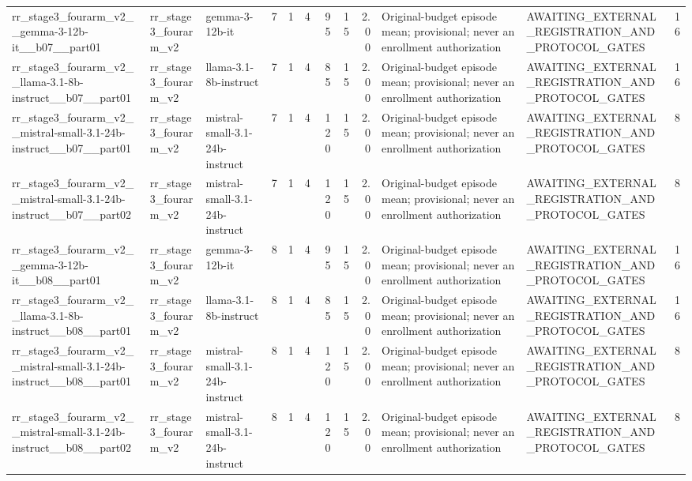 \begin{tabular}{lllrrrrrrllr}
rr\_stage3\_fourarm\_v2\_\_gemma-3-12b-it\_\_b07\_\_part01 & rr\_stage3\_fourarm\_v2 & gemma-3-12b-it & 7 & 1 & 4 & 95 & 15 & 2.00 & Original-budget episode mean; provisional; never an enrollment authorization & AWAITING\_EXTERNAL\_REGISTRATION\_AND\_PROTOCOL\_GATES & 16 \\
rr\_stage3\_fourarm\_v2\_\_llama-3.1-8b-instruct\_\_b07\_\_part01 & rr\_stage3\_fourarm\_v2 & llama-3.1-8b-instruct & 7 & 1 & 4 & 85 & 15 & 2.00 & Original-budget episode mean; provisional; never an enrollment authorization & AWAITING\_EXTERNAL\_REGISTRATION\_AND\_PROTOCOL\_GATES & 16 \\
rr\_stage3\_fourarm\_v2\_\_mistral-small-3.1-24b-instruct\_\_b07\_\_part01 & rr\_stage3\_fourarm\_v2 & mistral-small-3.1-24b-instruct & 7 & 1 & 4 & 120 & 15 & 2.00 & Original-budget episode mean; provisional; never an enrollment authorization & AWAITING\_EXTERNAL\_REGISTRATION\_AND\_PROTOCOL\_GATES & 8 \\
rr\_stage3\_fourarm\_v2\_\_mistral-small-3.1-24b-instruct\_\_b07\_\_part02 & rr\_stage3\_fourarm\_v2 & mistral-small-3.1-24b-instruct & 7 & 1 & 4 & 120 & 15 & 2.00 & Original-budget episode mean; provisional; never an enrollment authorization & AWAITING\_EXTERNAL\_REGISTRATION\_AND\_PROTOCOL\_GATES & 8 \\
rr\_stage3\_fourarm\_v2\_\_gemma-3-12b-it\_\_b08\_\_part01 & rr\_stage3\_fourarm\_v2 & gemma-3-12b-it & 8 & 1 & 4 & 95 & 15 & 2.00 & Original-budget episode mean; provisional; never an enrollment authorization & AWAITING\_EXTERNAL\_REGISTRATION\_AND\_PROTOCOL\_GATES & 16 \\
rr\_stage3\_fourarm\_v2\_\_llama-3.1-8b-instruct\_\_b08\_\_part01 & rr\_stage3\_fourarm\_v2 & llama-3.1-8b-instruct & 8 & 1 & 4 & 85 & 15 & 2.00 & Original-budget episode mean; provisional; never an enrollment authorization & AWAITING\_EXTERNAL\_REGISTRATION\_AND\_PROTOCOL\_GATES & 16 \\
rr\_stage3\_fourarm\_v2\_\_mistral-small-3.1-24b-instruct\_\_b08\_\_part01 & rr\_stage3\_fourarm\_v2 & mistral-small-3.1-24b-instruct & 8 & 1 & 4 & 120 & 15 & 2.00 & Original-budget episode mean; provisional; never an enrollment authorization & AWAITING\_EXTERNAL\_REGISTRATION\_AND\_PROTOCOL\_GATES & 8 \\
rr\_stage3\_fourarm\_v2\_\_mistral-small-3.1-24b-instruct\_\_b08\_\_part02 & rr\_stage3\_fourarm\_v2 & mistral-small-3.1-24b-instruct & 8 & 1 & 4 & 120 & 15 & 2.00 & Original-budget episode mean; provisional; never an enrollment authorization & AWAITING\_EXTERNAL\_REGISTRATION\_AND\_PROTOCOL\_GATES & 8 \\

\end{tabular}

